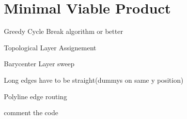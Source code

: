 \section{Minimal Viable Product}

\begin{list}{-}{}
\item Greedy Cycle Break algorithm or better
\item Topological Layer Assignement
\item Barycenter Layer sweep
\item Long edges have to be straight(dummys on same y position)
\item Polyline edge routing
\item comment the code
\end{list}
